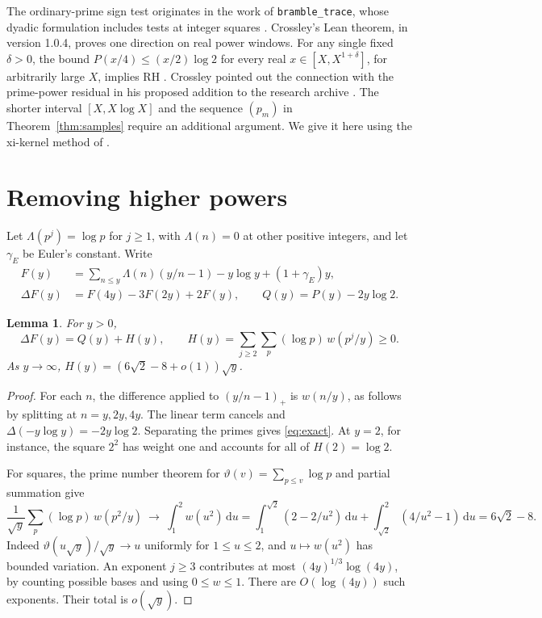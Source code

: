 \documentclass[11pt,a4paper]{article}
\newtheorem{lemma}[theorem]{Lemma}
\newcommand{\dd}{\,\mathrm d}
\begin{document}
The ordinary-prime sign test originates in the work of
\texttt{bramble\_trace}, whose dyadic formulation includes tests at
integer squares \cite{bramble}. Crossley's Lean theorem, in version
1.0.4, proves one direction on real power windows. For any single
fixed \(\delta>0\), the bound \(P(x/4)\le(x/2)\log2\) for every real
\(x\in[X,X^{1+\delta}]\), for arbitrarily large \(X\), implies RH
\cite{crossley}. Crossley pointed out the connection with the
prime-power residual in his proposed addition to the research archive
\cite{pr}. The shorter interval \([X,X\log X]\) and the sequence
\((p_m)\) in Theorem~\ref{thm:samples} require an additional argument.
We give it here using the xi-kernel method of \cite{windows}.

\section{Removing higher powers}

Let \(\Lambda(p^j)=\log p\) for \(j\ge1\), with \(\Lambda(n)=0\)
at other positive integers, and let \(\gamma_E\) be Euler's constant.
Write
\begin{align*}
 F(y)&=\sum_{n\le y}\Lambda(n)(y/n-1)-y\log y+(1+\gamma_E)y,\\
 \Delta F(y)&=F(4y)-3F(2y)+2F(y),\qquad Q(y)=P(y)-2y\log 2 .
\end{align*}

\begin{lemma}\label{lem:powers}
For \(y>0\),
\begin{equation}\label{eq:exact}
 \Delta F(y)=Q(y)+H(y),\qquad
 H(y)=\sum_{j\ge2}\sum_p(\log p)\,w(p^j/y)\ge0 .
\end{equation}
As \(y\to\infty\), \(H(y)=(6\sqrt2-8+o(1))\sqrt y\).
\end{lemma}
\begin{proof}
For each \(n\), the difference applied to \((y/n-1)_+\) is \(w(n/y)\),
as follows by splitting at \(n=y,2y,4y\). The linear term cancels and
\(\Delta(-y\log y)=-2y\log2\). Separating the primes gives
\eqref{eq:exact}. At \(y=2\), for instance, the square \(2^2\) has
weight one and accounts for all of \(H(2)=\log2\).

For squares, the prime number theorem for
\(\vartheta(v)=\sum_{p\le v}\log p\) and partial summation give
\[
 \frac{1}{\sqrt y}\sum_p(\log p)\,w(p^2/y)
 \ \longrightarrow\ \int_1^2 w(u^2)\dd u
 =\int_1^{\sqrt2}(2-2/u^2)\dd u+
   \int_{\sqrt2}^{2}(4/u^2-1)\dd u
 =6\sqrt2-8 .
\]
Indeed \(\vartheta(u\sqrt y)/\sqrt y\to u\) uniformly for \(1\le u\le2\),
and \(u\mapsto w(u^2)\) has bounded variation. An exponent \(j\ge3\)
contributes at most \((4y)^{1/3}\log(4y)\), by counting possible bases
and using \(0\le w\le1\). There are \(O(\log(4y))\) such exponents.
Their total is \(o(\sqrt y)\).
\end{proof}
\end{document}
